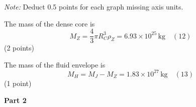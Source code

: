 \begin{description}

  \textit{Note:} Deduct 0.5 points for each graph missing axis units.

\item[(d)] The mass of the dense core is
  \[ M_Z = \frac{4}{3}\pi R_C^3 \rho_Z = 6.93 \times 10^{25}\,\mathrm{kg}
     \quad (12) \]
  \hfill(2 points)

  The mass of the fluid envelope is
  \[ M_H = M_J - M_Z = 1.83 \times 10^{27}\,\mathrm{kg} \quad (13) \]
  \hfill(1 point)
\end{description}

\medskip\noindent\textbf{Part 2}

